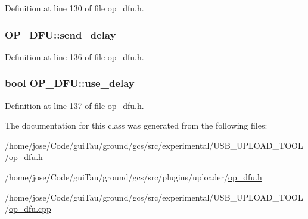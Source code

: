 Definition at line 130 of file op\-\_\-dfu.\-h.

\hypertarget{class_o_p___d_f_u_ad3ea03690b3c015ea33af11b17a7273b}{
\subsubsection[{send\-\_\-delay}]{ O\-P\-\_\-\-D\-F\-U\-::send\-\_\-delay}}\label{class_o_p___d_f_u_ad3ea03690b3c015ea33af11b17a7273b}


Definition at line 136 of file op\-\_\-dfu.\-h.

\hypertarget{class_o_p___d_f_u_a0553843cb6851615f6495aa64305552c}{
\subsubsection[{use\-\_\-delay}]{\setlength{\rightskip}{0pt plus 5cm}bool O\-P\-\_\-\-D\-F\-U\-::use\-\_\-delay}}\label{class_o_p___d_f_u_a0553843cb6851615f6495aa64305552c}


Definition at line 137 of file op\-\_\-dfu.\-h.



The documentation for this class was generated from the following files\-:\begin{DoxyCompactItemize}
\item 
/home/jose/\-Code/gui\-Tau/ground/gcs/src/experimental/\-U\-S\-B\-\_\-\-U\-P\-L\-O\-A\-D\-\_\-\-T\-O\-O\-L/\hyperlink{experimental_2_u_s_b___u_p_l_o_a_d___t_o_o_l_2op__dfu_8h}{op\-\_\-dfu.\-h}\item 
/home/jose/\-Code/gui\-Tau/ground/gcs/src/plugins/uploader/\hyperlink{plugins_2uploader_2op__dfu_8h}{op\-\_\-dfu.\-h}\item 
/home/jose/\-Code/gui\-Tau/ground/gcs/src/experimental/\-U\-S\-B\-\_\-\-U\-P\-L\-O\-A\-D\-\_\-\-T\-O\-O\-L/\hyperlink{experimental_2_u_s_b___u_p_l_o_a_d___t_o_o_l_2op__dfu_8cpp}{op\-\_\-dfu.\-cpp}\end{DoxyCompactItemize}
